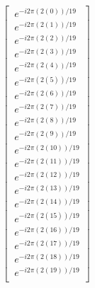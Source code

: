 \documentclass[preview]{standalone}
\begin{document}
\begin{align*}
\left[\begin{array}{l}\
            e^{-i 2 \pi(2(0)) / 19  }\\\
            e^{-i 2 \pi(2(1)) / 19  }\\\
            e^{-i 2 \pi(2(2)) / 19  }\\\
            e^{-i 2 \pi(2(3)) / 19  }\\\
            e^{-i 2 \pi(2(4)) / 19  }\\\
            e^{-i 2 \pi(2(5)) / 19  }\\\
            e^{-i 2 \pi(2(6)) / 19  }\\\
            e^{-i 2 \pi(2(7)) / 19  }\\\
            e^{-i 2 \pi(2(8)) / 19  }\\\
            e^{-i 2 \pi(2(9)) / 19  }\\\
            e^{-i 2 \pi(2(10)) / 19 }\\\
            e^{-i 2 \pi(2(11)) / 19 }\\\
            e^{-i 2 \pi(2(12)) / 19 }\\\
            e^{-i 2 \pi(2(13)) / 19 }\\\
            e^{-i 2 \pi(2(14)) / 19 }\\\
            e^{-i 2 \pi(2(15)) / 19 }\\\
            e^{-i 2 \pi(2(16)) / 19 }\\\
            e^{-i 2 \pi(2(17)) / 19 }\\\
            e^{-i 2 \pi(2(18)) / 19 }\\\
            e^{-i 2 \pi(2(19)) / 19 }\\\
            \end{array}\right]
\end{align*}
\end{document}
